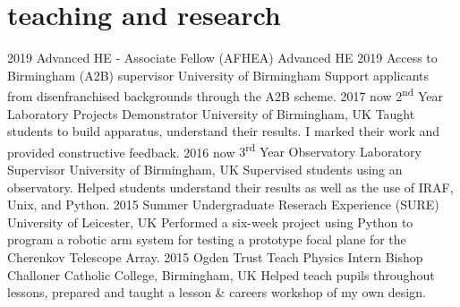 \documentclass[]{k-cv} %
\begin{document}
\section{\color{c2}teaching and research}
\begin{entrylist}
	\centry
	{2019}
	{Advanced HE - \textcolor{c2}{Associate Fellow} (AFHEA)}
	{Advanced HE}
	{}
	\centry
	{2019}
	{Access to Birmingham (A2B) supervisor}
	{University of Birmingham}
	{Support applicants from disenfranchised backgrounds through the A2B scheme.}
	\centry
	{2017 \to now}
	{2\textsuperscript{nd} Year Laboratory Projects Demonstrator}
	{University of Birmingham, UK}
	{Taught students to build apparatus, understand their results. I marked their work and provided constructive feedback.}
	\centry
	{2016 \to now}
	{3\textsuperscript{rd} Year Observatory Laboratory Supervisor}
	{University of Birmingham, UK}
	{Supervised students using an observatory. Helped students understand their results as well as the use of IRAF, Unix, and Python.}
	\centry
	{2015}
	{Summer Undergraduate Reserach Experience (SURE)}
	{University of Leicester, UK}
	{Performed a six-week project using Python to program a robotic arm system for testing a prototype focal plane for the Cherenkov Telescope Array.}
	\centry
	{2015}
	{Ogden Trust Teach Physics Intern}
	{Bishop Challoner Catholic College, Birmingham, UK}
	{Helped teach pupils throughout lessons, prepared and taught a lesson \& careers workshop of my own
		design.}
\end{entrylist}
\end{document}
